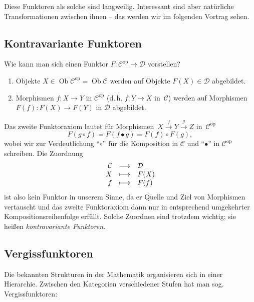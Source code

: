 \documentclass[a4paper,ngerman]{scrartcl}
\theoremstyle{definition}
\theoremstyle{plain}
\theoremstyle{remark}
\newcommand{\xra}[1]{\xrightarrow{#1}}
\newcommand{\C}{\mathcal{C}}
\newcommand{\D}{\mathcal{D}}
\DeclareMathOperator{\Ob}{Ob}
\newcommand{\op}{\mathrm{op}}
\begin{document}
Diese Funktoren als solche sind langweilig. Interessant sind aber natürliche
Transformationen zwischen ihnen -- das werden wir im folgenden Vortrag sehen.


\subsection{Kontravariante Funktoren}

Wie kann man sich einen Funktor $F : \C^\op \to \D$ vorstellen?
\begin{enumerate}
  \item Objekte $X \in \Ob \C^\op = \Ob \C$ werden auf Objekte $F(X) \in \mathcal{D}$
  abgebildet.
  \item Morphismen $f : X \to Y$ in $\C^\op$ (d.\,h. $f : Y \to X$ in~$\C$)
  werden auf Morphismen $F(f) : F(X) \to F(Y)$ in $\mathcal{D}$ abgebildet.
\end{enumerate}
Das zweite Funktoraxiom lautet für Morphismen~$X \xra{f} Y \xra{g} Z$
in~$\C^\op$
\[ F(g \circ f) = F(f \bullet g) = F(f) \circ F(g), \] 
wobei wir zur Verdeutlichung "`$\circ$"' für die Komposition in $\C$ und
"`$\bullet$"' in $\C^\op$ schreiben. Die Zuordnung
\[ \begin{array}{@{}rcl@{}}
  \C &\longrightarrow& \D \\
  X  &\longmapsto& F(X) \\
  f  &\longmapsto& F(f)
\end{array} \]
ist also kein Funktor in unserem Sinne, da er Quelle und Ziel von Morphismen
vertauscht und das zweite Funktoraxiom dann nur in entsprechend umgekehrter
Kompositionsreihenfolge erfüllt. Solche Zuordnen sind trotzdem wichtig; sie
heißen \emph{kontravariante Funktoren}.


\subsection{Vergissfunktoren}

Die bekannten Strukturen in der Mathematik organisieren sich in einer
Hierarchie. Zwischen den Kategorien verschiedener Stufen hat man sog.
Vergissfunktoren:
\end{document}
